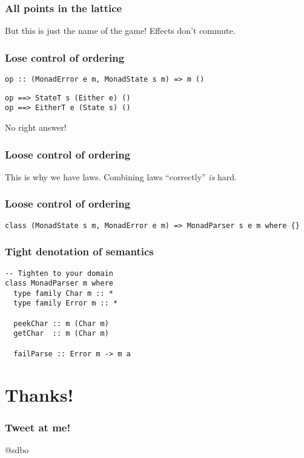 \documentclass[pdf]{beamer}
\begin{document}
\begin{frame}
  \frametitle{All points in the lattice}
  But this is just the name of the game! Effects don't commute.
\end{frame}

\begin{frame}
  \frametitle{Lose control of ordering}
\begin{lstlisting}
op :: (MonadError e m, MonadState s m) => m ()
\end{lstlisting}
  \pause
\begin{lstlisting}
op ==> StateT s (Either e) ()
op ==> EitherT e (State s) ()
\end{lstlisting}
  \pause
No right answer!
\end{frame}

\begin{frame}
  \frametitle{Loose control of ordering}
  This is why we have laws.
  \pause
  Combining laws ``correctly'' \textit{is} hard.
\end{frame}

\begin{frame}[fragile]
  \frametitle{Loose control of ordering}
\begin{lstlisting}
class (MonadState s m, MonadError e m) => MonadParser s e m where {}
\end{lstlisting}
\end{frame}

\begin{frame}[fragile]
  \frametitle{Tight denotation of semantics}
\begin{lstlisting}
-- Tighten to your domain
class MonadParser m where
  type family Char m :: *
  type family Error m :: *

  peekChar :: m (Char m)
  getChar  :: m (Char m)
  
  failParse :: Error m -> m a
\end{lstlisting}
\end{frame}

\section{Thanks!}

\begin{frame}
  \frametitle{Tweet at me!}
  \begin{center}
    @sdbo
  \end{center}
\end{frame}
\end{document}
